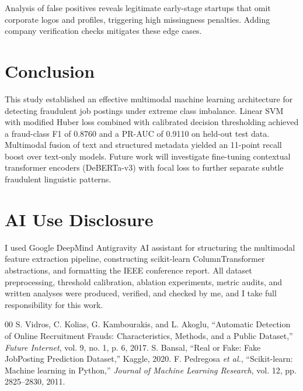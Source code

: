 \documentclass[conference]{IEEEtran}
\begin{document}
Analysis of false positives reveals legitimate early-stage startups that omit corporate logos and profiles, triggering high missingness penalties. Adding company verification checks mitigates these edge cases.

\section{Conclusion}
This study established an effective multimodal machine learning architecture for detecting fraudulent job postings under extreme class imbalance. Linear SVM with modified Huber loss combined with calibrated decision thresholding achieved a fraud-class F1 of 0.8760 and a PR-AUC of 0.9110 on held-out test data. Multimodal fusion of text and structured metadata yielded an 11-point recall boost over text-only models. Future work will investigate fine-tuning contextual transformer encoders (DeBERTa-v3) with focal loss to further separate subtle fraudulent linguistic patterns.

\section*{AI Use Disclosure}
I used Google DeepMind Antigravity AI assistant for structuring the multimodal feature extraction pipeline, constructing scikit-learn ColumnTransformer abstractions, and formatting the IEEE conference report. All dataset preprocessing, threshold calibration, ablation experiments, metric audits, and written analyses were produced, verified, and checked by me, and I take full responsibility for this work.

\begin{thebibliography}{00}
 S. Vidros, C. Kolias, G. Kambourakis, and L. Akoglu, ``Automatic Detection of Online Recruitment Frauds: Characteristics, Methods, and a Public Dataset,'' \textit{Future Internet}, vol. 9, no. 1, p. 6, 2017.
 S. Bansal, ``Real or Fake: Fake JobPosting Prediction Dataset,'' Kaggle, 2020.
 F. Pedregosa \textit{et al.}, ``Scikit-learn: Machine learning in Python,'' \textit{Journal of Machine Learning Research}, vol. 12, pp. 2825--2830, 2011.
\end{thebibliography}
\end{document}
